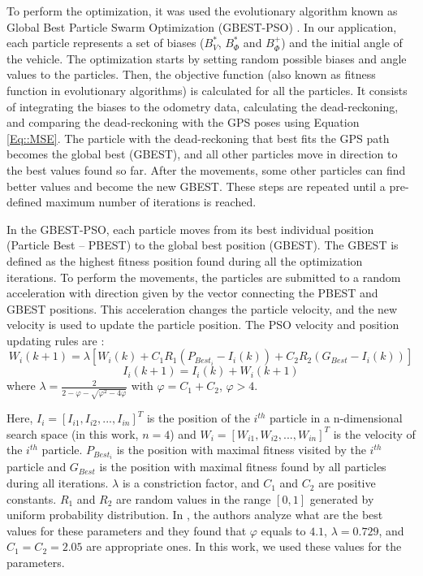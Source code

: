 To perform the optimization, it was used the evolutionary algorithm known as Global Best Particle Swarm Optimization (GBEST-PSO) \cite{53eberhart1995new, 70clerc2002particle, 71de2009swarm}. In our application, each particle represents a set of biases ($B_V^*$, $B_\Phi^*$ and $B_\Phi^+$) and the initial angle of the vehicle. The optimization starts by setting random possible biases and angle values to the particles. Then, the objective function (also known as fitness function in evolutionary algorithms) is calculated for all the particles. It consists of integrating the biases to the odometry data, calculating the dead-reckoning, and comparing the dead-reckoning with the GPS poses using Equation \ref{Eq::MSE}. The particle with the dead-reckoning that best fits the GPS path becomes the global best (GBEST), and all other particles move in direction to the best values found so far. After the movements, some other particles can find better values and become the new GBEST. These steps are repeated until a pre-defined maximum number of iterations is reached.

In the GBEST-PSO, each particle moves from its best individual position (Particle Best – PBEST) to the global best position (GBEST). The GBEST is defined as the highest fitness position found during all the optimization iterations. To perform the movements, the particles are submitted to a random acceleration with direction given by the vector connecting the PBEST and GBEST positions. This acceleration changes the particle velocity, and the new velocity is used to update the particle position. The PSO velocity and position updating rules are \cite{70clerc2002particle}:
\begin{equation}
\label{Eq::PSOVelocity}
W_i(k+1)=\lambda \left[ W_i(k)+C_1 R_1 \left( P_{Best_i} - I_i(k)\right) +C_2 R_2 \left( G_{Best}-I_i(k)\right) \right]
\end{equation}
\begin{equation}
\label{Eq::VelocityUpdate}
I_i(k+1)=I_i(k)+W_i(k+1)
\end{equation}
where $\lambda=\frac{2}{2-\varphi-\sqrt{\varphi^2-4\varphi}}$ with  $\varphi = C_1+C_2$, $\varphi>4$.

Here, $I_i = [I_{i1}, I_{i2}, ..., I_{in}]^T$ is the position of the $i^{th}$ particle in a n-dimensional  search space (in this work, $n=4$) and $W_i = [W_{i1}, W_{i2}, ..., W_{in}]^T$ is the velocity of the $i^{th}$ particle. $P_{Best_i}$ is the position with maximal fitness visited by the $i^{th}$ particle and $G_{Best}$ is the position with maximal fitness found by all particles during all iterations. $\lambda$ is a constriction factor, and $C_1$ and $C_2$ are positive constants. $R_1$ and $R_2$ are random values in the range $[0,1]$ generated by uniform probability distribution. In \cite{70clerc2002particle}, the authors analyze what are the best values for these parameters and they found that $\varphi$ equals to $4.1$, $\lambda=0.729$, and $C_1=C_2=2.05$ are appropriate ones. In this work, we used these values for the parameters.


